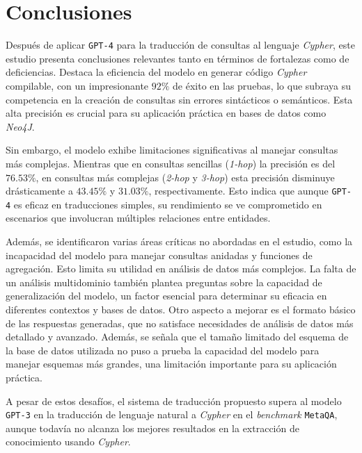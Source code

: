 \chapter*{Conclusiones}\label{chapter:conclusions}
Después de aplicar \texttt{GPT-4} para la traducción de consultas al lenguaje \textit{Cypher}, este estudio presenta conclusiones relevantes tanto en términos de fortalezas como de deficiencias. Destaca la eficiencia del modelo en generar código \textit{Cypher} compilable, con un impresionante $92\%$ de éxito en las pruebas, lo que subraya su competencia en la creación de consultas sin errores sintácticos o semánticos. Esta alta precisión es crucial para su aplicación práctica en bases de datos como \textit{Neo4J}.

Sin embargo, el modelo exhibe limitaciones significativas al manejar consultas más complejas. Mientras que en consultas sencillas (\textit{1-hop}) la precisión es del $76.53\%$, en consultas más complejas (\textit{2-hop} y \textit{3-hop}) esta precisión disminuye drásticamente a $43.45\%$ y $31.03\%$, respectivamente. Esto indica que aunque \texttt{GPT-4} es eficaz en traducciones simples, su rendimiento se ve comprometido en escenarios que involucran múltiples relaciones entre entidades.

Además, se identificaron varias áreas críticas no abordadas en el estudio, como la incapacidad del modelo para manejar consultas anidadas y funciones de agregación. Esto limita su utilidad en análisis de datos más complejos. La falta de un análisis multidominio también plantea preguntas sobre la capacidad de generalización del modelo, un factor esencial para determinar su eficacia en diferentes contextos y bases de datos. Otro aspecto a mejorar es el formato básico de las respuestas generadas, que no satisface necesidades de análisis de datos más detallado y avanzado. Además, se señala que el tamaño limitado del esquema de la base de datos utilizada no puso a prueba la capacidad del modelo para manejar esquemas más grandes, una limitación importante para su aplicación práctica.

A pesar de estos desafíos, el sistema de traducción propuesto supera al modelo \texttt{GPT-3} en la traducción de lenguaje natural a \textit{Cypher} en el \textit{benchmark} \texttt{MetaQA}, aunque todavía no alcanza los mejores resultados en la extracción de conocimiento usando \textit{Cypher}. 

